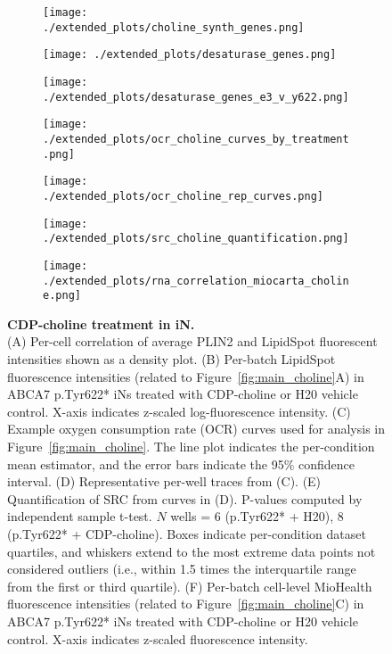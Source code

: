 \begin{figure}[ht]
    \begin{subfigure}[t]{.3\textwidth}
        \caption{}
        \texttt{[image: ./extended\_plots/choline\_synth\_genes.png]}        
    \end{subfigure}
    \begin{subfigure}[t]{.3\textwidth}
        \caption{}
        \texttt{[image: ./extended\_plots/desaturase\_genes.png]}        
    \end{subfigure}
    \begin{subfigure}[t]{.3\textwidth}
        \caption{}
        \texttt{[image: ./extended\_plots/desaturase\_genes\_e3\_v\_y622.png]}        
    \end{subfigure}
    \begin{subfigure}[t]{.3\textwidth}
        \caption{}
        \texttt{[image: ./extended\_plots/ocr\_choline\_curves\_by\_treatment.png]}        
    \end{subfigure}
    \begin{subfigure}[t]{.3\textwidth}
        \caption{}
        \texttt{[image: ./extended\_plots/ocr\_choline\_rep\_curves.png]}        
    \end{subfigure}
    \begin{subfigure}[t]{.3\textwidth}
        \caption{}
        \texttt{[image: ./extended\_plots/src\_choline\_quantification.png]}        
    \end{subfigure}
    \begin{subfigure}[t]{.3\textwidth}
        \caption{}
        \texttt{[image: ./extended\_plots/rna\_correlation\_miocarta\_choline.png]}        
    \end{subfigure}
    \caption{
         \textbf{CDP-choline treatment in iN.}\\[1ex]
         (A) Per-cell correlation of average PLIN2 and LipidSpot fluorescent intensities shown as a density plot. 
         (B) Per-batch LipidSpot fluorescence intensities (related to Figure~\ref{fig:main_choline}A) in ABCA7 p.Tyr622* iNs treated with CDP-choline or H20 vehicle control. X-axis indicates z-scaled log-fluorescence intensity. 
         (C) Example oxygen consumption rate (OCR) curves used for analysis in Figure~\ref{fig:main_choline}. The line plot indicates the per-condition mean estimator, and the error bars indicate the 95\% confidence interval. 
         (D) Representative per-well traces from (C). 
         (E) Quantification of SRC from curves in (D). P-values computed by independent sample t-test. $N$ wells = 6 (p.Tyr622* + H20), 8 (p.Tyr622* + CDP-choline). Boxes indicate per-condition dataset quartiles, and whiskers extend to the most extreme data points not considered outliers (i.e., within 1.5 times the interquartile range from the first or third quartile). 
         (F) Per-batch cell-level MioHealth fluorescence intensities (related to Figure~\ref{fig:main_choline}C) in ABCA7 p.Tyr622* iNs treated with CDP-choline or H20 vehicle control. X-axis indicates z-scaled fluorescence intensity.
     }
     \label{fig:lipid_mitochondrial_effects_CDP_choline}
 \end{figure}